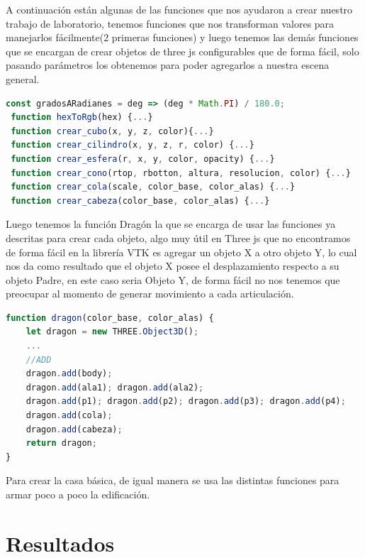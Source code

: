 \documentclass[11pt]{article}
\begin{document}
A continuación están algunas de las funciones que nos ayudaron a crear nuestro trabajo de laboratorio, tenemos funciones que nos transforman valores para manejarlos fácilmente(2 primeras funciones) y luego tenemos las demás funciones que se encargan de crear objetos de three js configurables que de forma fácil, solo pasando parámetros los obtenemos para poder agregarlos a nuestra escena general.\\


\begin{lstlisting}[language=javascript,frame=single]
 const gradosARadianes = deg => (deg * Math.PI) / 180.0;
 function hexToRgb(hex) {...}
 function crear_cubo(x, y, z, color){...}
 function crear_cilindro(x, y, z, r, color) {...}
 function crear_esfera(r, x, y, color, opacity) {...}
 function crear_cono(rtop, rbotton, altura, resolucion, color) {...}
 function crear_cola(scale, color_base, color_alas) {...}
 function crear_cabeza(color_base, color_alas) {...}
\end{lstlisting}
Luego tenemos la función Dragón la que se encarga de usar las funciones ya descritas para crear cada objeto, algo muy útil en Three js que no encontramos de forma fácil en la librería VTK es agregar un objeto X a otro objeto Y, lo cual nos da como resultado que el objeto X posee el desplazamiento respecto a su objeto Padre, en este caso seria Objeto Y, de forma fácil no nos tenemos que preocupar al momento de generar movimiento a cada articulación.
\\


\begin{lstlisting}[language=javascript,frame=single]
 function dragon(color_base, color_alas) {
    let dragon = new THREE.Object3D();
    ...
    //ADD
    dragon.add(body);
    dragon.add(ala1); dragon.add(ala2);
    dragon.add(p1); dragon.add(p2); dragon.add(p3); dragon.add(p4);
    dragon.add(cola);
    dragon.add(cabeza);
    return dragon;
}
\end{lstlisting}
Para crear la casa básica, de igual manera se usa las distintas funciones para armar poco a poco la edificación.
\section{Resultados}
\
\end{document}
